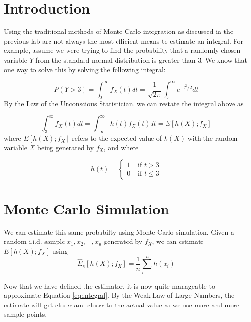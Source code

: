 \label{lab:montecarlo2}

\section*{Introduction}

Using the traditional methods of Monte Carlo integration as discussed in the previous lab are not always the most efficient means to estimate an integral. For example, assume we were trying to find the probability that a randomly chosen variable $Y$ from the standard normal distribution is greater than $3$. We know that one way to solve this by solving the following integral:

\begin{equation} \label{eq:integral} 
P(Y > 3) = \int_{3}^{\infty} f_X(t) dt = \frac{1}{\sqrt{2\pi}}\int_{3}^{\infty} e^{-t^2/2} dt
\end{equation}
By the Law of the Unconscious Statistician, we can restate the integral above as

\begin{equation*}
\int_{3}^{\infty} f_X(t) dt = \int_{-\infty}^{\infty} h(t)f_X(t) dt = E[h(X);f_X]
\end{equation*}
where $E[h(X);f_X]$ refers to the expected value of $h(X)$ with the random variable $X$ being generated by $f_X$, and where

$$h(t) = \begin{cases}
1 & \text{ if } t > 3 \\ 
0 & \text{ if } t \leq 3 
\end{cases} $$

\section*{Monte Carlo Simulation}
We can estimate this same probabilty using Monte Carlo simulation. 
Given a random i.i.d. sample $x_1, x_2, \cdots , x_n$ generated by $f_X$, we can estimate $E[h(X);f_X]$ using
\begin{equation} \label{eq:estimator}
\widehat{E}_n[h(X);f_X] = \frac{1}{n}\sum_{i = 1}^{n}h(x_i)
\end{equation}

Now that we have defined the estimator, it is now quite manageable to approximate Equation \ref{eq:integral}. By the Weak Law of Large Numbers, the estimate will get closer and closer to the actual value as we use more and more sample points.

